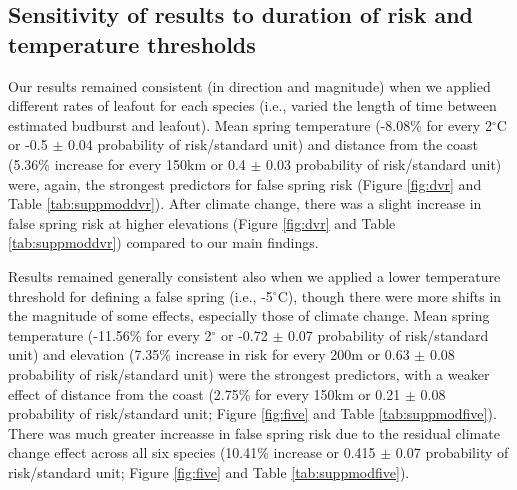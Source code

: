 \documentclass{article}\usepackage[]{graphicx}\usepackage[]{color}
\begin{document}
\subsection*{Sensitivity of results to duration of risk and temperature thresholds}
Our results remained consistent (in direction and magnitude) when we applied different rates of leafout for each species (i.e., varied the length of time between estimated budburst and leafout). Mean spring temperature (-8.08\% for every 2$^\circ$C or -0.5 $\pm$ 0.04 probability of risk/standard unit) and distance from the coast (5.36\% increase for every 150km or 0.4 $\pm$ 0.03 probability of risk/standard unit) were, again, the strongest predictors for false spring risk (Figure \ref{fig:dvr} and Table \ref{tab:suppmoddvr}). After climate change, there was a slight increase in false spring risk at higher elevations (Figure \ref{fig:dvr} and Table \ref{tab:suppmoddvr}) compared to our main findings. 

Results remained generally consistent also when we applied a lower temperature threshold for defining a false spring (i.e., -5$^{\circ}$C), though there were more shifts in the magnitude of some effects, especially those of climate change. Mean spring temperature (-11.56\% for every 2$^\circ$ or -0.72 $\pm$ 0.07 probability of risk/standard unit) and elevation (7.35\% increase in risk for every 200m or 0.63 $\pm$ 0.08 probability of risk/standard unit) were the strongest predictors, with a weaker effect of distance from the coast (2.75\% for every 150km or 0.21 $\pm$ 0.08 probability of risk/standard unit; Figure \ref{fig:five} and Table \ref{tab:suppmodfive}). There was much greater increasse in false spring risk due to the residual climate change effect across all six species (10.41\% increase or 0.415 $\pm$ 0.07 probability of risk/standard unit; Figure \ref{fig:five} and Table \ref{tab:suppmodfive}). 
\end{document}
